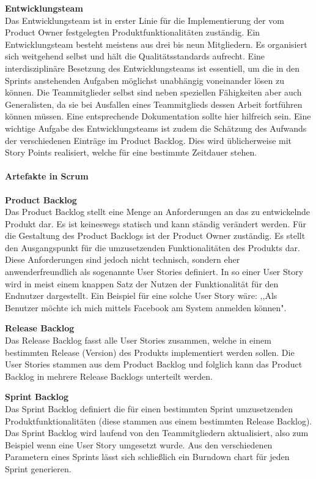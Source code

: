 \textbf{Entwicklungsteam}\\
Das Entwicklungsteam ist in erster Linie für die Implementierung der vom Product Owner festgelegten Produktfunktionalitäten zuständig. Ein Entwicklungsteam besteht meistens aus drei bis neun Mitgliedern. Es organisiert sich weitgehend selbst und hält die Qualitätsstandards aufrecht. Eine interdisziplinäre Besetzung des Entwicklungsteams ist essentiell, um die in den Sprints anstehenden Aufgaben möglichst unabhängig voneinander lösen zu können. Die Teammitglieder selbst sind neben speziellen Fähigkeiten aber auch Generalisten, da sie bei Ausfallen eines Teammitglieds dessen Arbeit fortführen können müssen. Eine entsprechende Dokumentation sollte hier hilfreich sein. Eine wichtige Aufgabe des Entwicklungsteams ist zudem die Schätzung des Aufwands der verschiedenen Einträge im Product Backlog. Dies wird üblicherweise mit Story Points realisiert, welche für eine bestimmte Zeitdauer stehen. \cite{SCRUM}

\paragraph{Artefakte in Scrum}
\textbf{Product Backlog}\\
Das Product Backlog stellt eine Menge an Anforderungen an das zu entwickelnde Produkt dar. Es ist keineswegs statisch und kann ständig verändert werden. Für die Gestaltung des Product Backlogs ist der Product Owner zuständig. Es stellt den Ausgangspunkt für die umzusetzenden Funktionalitäten des Produkts dar. Diese Anforderungen sind jedoch nicht technisch, sondern eher anwenderfreundlich als sogenannte User Stories definiert. In so einer User Story wird in meist einem knappen Satz der Nutzen der Funktionalität für den Endnutzer dargestellt. Ein Beispiel für eine solche User Story wäre: ,,Als Benutzer möchte ich mich mittels Facebook am System anmelden können". \cite{SCRUM}

\textbf{Release Backlog}\\
Das Release Backlog fasst alle User Stories zusammen, welche in einem bestimmten Release (Version) des Produkts implementiert werden sollen. Die User Stories stammen aus dem Product Backlog und folglich kann das Product Backlog in mehrere Release Backlogs unterteilt werden. \cite{SCRUM}

\textbf{Sprint Backlog}\\
Das Sprint Backlog definiert die für einen bestimmten Sprint umzusetzenden Produktfunktionalitäten (diese stammen aus einem bestimmten Release Backlog). Das Sprint Backlog wird laufend von den Teammitgliedern aktualisiert, also zum Beispiel wenn eine User Story umgesetzt wurde. Aus den verschiedenen Parametern eines Sprints lässt sich schließlich ein Burndown chart für jeden Sprint generieren. \cite{SCRUM}

